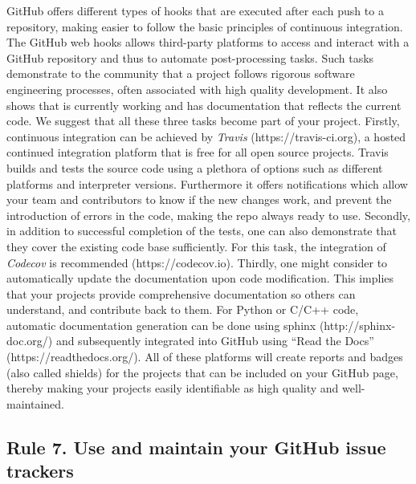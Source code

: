 \documentclass[10pt,letterpaper]{article}
\begin{document}
GitHub offers different types of hooks that are executed after each push
to a repository, making easier to follow the basic principles of
continuous integration. The GitHub web hooks allows third-party
platforms to access and interact with a GitHub repository and thus to
automate post-processing tasks. Such tasks demonstrate to the community
that a project follows rigorous software engineering processes, often
associated with high quality development. It also shows that is
currently working and has documentation that reflects the current code.
We suggest that all these three tasks become part of your project.
Firstly, continuous integration can be achieved by \emph{Travis}
(https://travis-ci.org), a hosted continued integration platform that is
free for all open source projects. Travis builds and tests the source
code using a plethora of options such as different platforms and
interpreter versions. Furthermore it offers notifications which allow
your team and contributors to know if the new changes work, and prevent
the introduction of errors in the code, making the repo always ready to
use. Secondly, in addition to successful completion of the tests, one
can also demonstrate that they cover the existing code base
sufficiently. For this task, the integration of \emph{Codecov} is
recommended (https://codecov.io). Thirdly, one might consider to
automatically update the documentation upon code modification. This
implies that your projects provide comprehensive documentation so others
can understand, and contribute back to them. For Python or C/C++ code,
automatic documentation generation can be done using sphinx
(http://sphinx-doc.org/) and subsequently integrated into GitHub using
``Read the Docs'' (https://readthedocs.org/). All of these platforms
will create reports and badges (also called shields) for the projects
that can be included on your GitHub page, thereby making your projects
easily identifiable as high quality and well-maintained.

\subsection*{Rule 7. Use and maintain your GitHub issue
trackers}\label{rule-7.-use-and-maintain-your-github-issue-trackers}
\end{document}
